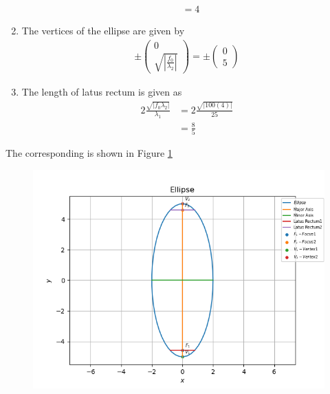 \documentclass[12pt]{article}
\providecommand{\brak}[1]{\ensuremath{\left(#1\right)}}
\providecommand{\abs}[1]{\left\vert#1\right\vert}
\newcommand{\myvec}[1]{\ensuremath{\begin{pmatrix}#1\end{pmatrix}}}
\begin{document}
\begin{enumerate}
\begin{align}
	&= 4
\end{align}
\item The vertices of the ellipse are given by
\begin{align}
	\pm \myvec{0\\\sqrt{\abs{\frac{f_0}{\lambda_2}}}}= \pm \myvec{0\\5}
\end{align}
\item The length of latus rectum is given as
\begin{align}
	2\frac{\sqrt{\abs{f_0 \lambda_2}}}{\lambda_1} &= 2\frac{\sqrt{\abs{100\brak{4}}}}{25}\\
	&= \frac{8}{5}
\end{align}
\end{enumerate}
The corresponding is shown in Figure \ref{fig:Fig1}
\begin{figure}[!h]
	\begin{center} 
	    \includegraphics[width=\columnwidth]{figs/ellipse}
	\end{center}
\caption{}
\label{fig:Fig1}
\end{figure}
\end{document}

